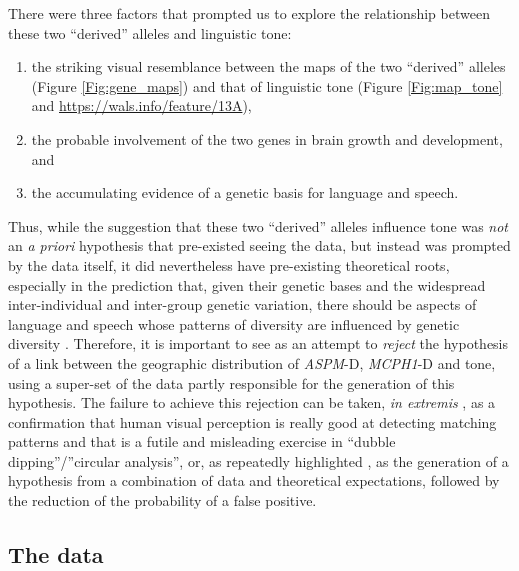 \documentclass[twoside,onecolumn]{article}
\begin{document}
There were three factors that prompted us to explore the relationship between these two ``derived'' alleles and linguistic tone:

\begin{enumerate}[label={\alph*)}]
	\item the striking visual resemblance between the maps of the two ``derived'' alleles (Figure \ref{Fig:gene_maps}) and that of linguistic tone (Figure \ref{Fig:map_tone} and \url{https://wals.info/feature/13A}),
	\item the probable involvement of the two genes in brain growth and development, and
	\item the accumulating evidence of a genetic basis for language and speech.
\end{enumerate}

Thus, while the suggestion that these two ``derived'' alleles influence tone was \emph{not} an \textit{a priori} hypothesis that pre-existed seeing the data, but instead was prompted by the data itself, it did nevertheless have pre-existing theoretical roots, especially in the prediction that, given their genetic bases and the widespread inter-individual and inter-group genetic variation, there should be aspects of language and speech whose patterns of diversity are influenced by genetic diversity \citep{dediu_msc_2002,dediu_phd_2007}.
Therefore, it is important to see \citet{dediu_ladd_2007} as an attempt to \emph{reject} the hypothesis of a link between the geographic distribution of \textit{ASPM}-D, \textit{MCPH1}-D and tone, using a super-set of the data partly responsible for the generation of this hypothesis.
The failure to achieve this rejection can be taken, \textit{in extremis} \citep{collins_tone_2016}, as a confirmation that human visual perception is really good at detecting matching patterns and that \citet{dediu_ladd_2007} is a futile and misleading exercise in ``dubble dipping''/''circular analysis'', or, as repeatedly highlighted \citep{dediu_ladd_2007,dediu_phd_2007,ladd_bioling_2008}, as the generation of a hypothesis from a combination of data and theoretical expectations, followed by the reduction of the probability of a false positive.

\subsection{The data}
\end{document}
